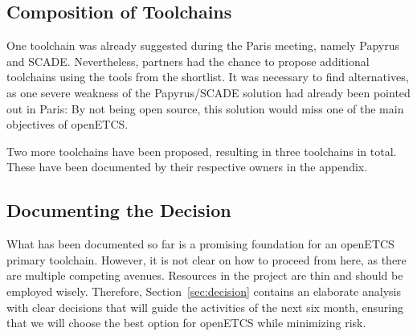 \subsection{Composition of Toolchains}
\label{sec:composition_of_tool_chains}

One toolchain was already suggested during the Paris meeting, namely Papyrus and SCADE.  Nevertheless, partners had the chance to propose additional toolchains using the tools from the shortlist.  It was necessary to find alternatives, as one severe weakness of the Papyrus/SCADE solution had already been pointed out in Paris: By not being open source, this solution would miss one of the main objectives of openETCS.

Two more toolchains have been proposed, resulting in three toolchains in total.  These have been documented by their respective owners in the appendix.

\subsection{Documenting the Decision}
\label{sec:documenting_the_decision}

What has been documented so far is a promising foundation for an openETCS primary toolchain.  However, it is not clear on how to proceed from here, as there are multiple competing avenues.  Resources in the project are thin and should be employed wisely.  Therefore, Section~\ref{sec:decision} contains an elaborate analysis with clear decisions that will guide the activities of the next six month, ensuring that we will choose the best option for openETCS while minimizing risk.



